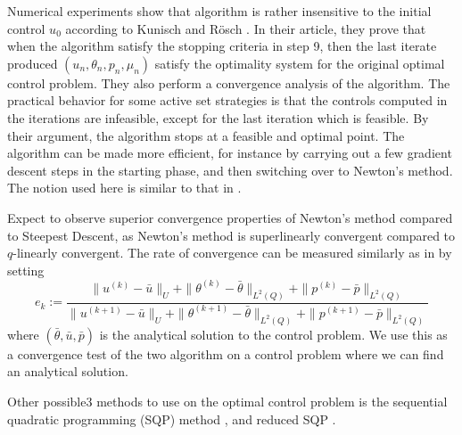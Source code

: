 Numerical experiments show that algorithm is rather insensitive to the initial control $u_0$  according to Kunisch and Rösch \cite{primal_dual}. In their article, they prove that when the algorithm satisfy the stopping criteria in step 9, then the last iterate produced $(u_n, \theta_n, p_n, \mu_n)$ satisfy the optimality system for the original optimal control problem. They also perform a convergence analysis of the algorithm. The practical behavior for some active set strategies is that the controls computed in the iterations are infeasible, except for the last iteration which is feasible. By their argument, the algorithm stops at a feasible and optimal point. The algorithm can be made more efficient, for instance by carrying out a few gradient descent steps in the starting phase, and then switching over to Newton's method. The notion used here is similar to that in \cite{Algorithms}.

Expect to observe superior convergence properties of Newton's method compared to Steepest Descent, as Newton's method is superlinearly convergent compared to $q$-linearly convergent. The rate of convergence can be measured similarly as in \cite{DPSteel} by setting 
\begin{equation}
    \label{eq:rate_of_conv}
    e_k := \frac{\|u^{(k)}-\bar{u}\|_U + \|\theta^{(k)}-\bar{\theta}\|_{L^2(Q)} +\|p^{(k)}-\bar{p}\|_{L^2(Q)} }{\|u^{(k+1)}-\bar{u}\|_U + \|\theta^{(k+1)}-\bar{\theta}\|_{L^2(Q)} +\|p^{(k+1)}-\bar{p}\|_{L^2(Q)}}
\end{equation}
where $(\bar{\theta},\bar{u},\bar{p})$ is the analytical solution to the control problem. We use this as a convergence test of the two algorithm on a control problem where we can find an analytical solution. 

Other possible3 methods to use on the optimal control problem is the sequential quadratic programming (SQP) method \cite{Algorithms}, and reduced SQP \cite{DPSteel}. 
